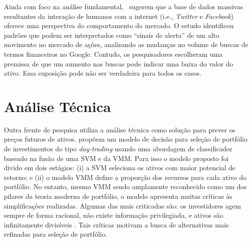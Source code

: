 Ainda com foco na análise fundamental,~\textcite{google_trends} sugerem que a base de dados massivas resultantes da interação de humanos com a internet (i.e., \textit{Twitter} e \textit{Facebook}) oferece uma perspectiva do comportamento do mercado. O estudo identificou padrões que podem ser interpretados como ``sinais de alerta'' de um alto movimento no mercado de ações, analisando as mudanças no volume de buscas de termos financeiros no Google. Contudo, os pesquisadores escolheram uma premissa de que um aumento nas buscas pode indicar uma baixa do valor do ativo. Essa suposição pode não ser verdadeira para todos os casos.


\section{Análise Técnica}

Outra frente de pesquisa utiliza a análise técnica como solução para prever os preços futuros de ativos. \textcite{fusionportifolio} propõem um modelo de decisão para seleção de portfólio de investimentos do tipo \emph{day-trading} usando uma abordagem de classificador baseado na fusão de uma \acrshort{SVM} e da \acrshort{VMM}. Para isso o modelo proposto foi divido em dois estágios: (i) a \acrshort{SVM} seleciona os ativos com maior potencial de retorno; e (ii) o modelo \acrshort{VMM} define a proporção dos recursos para cada ativo do portfólio. No entanto, mesmo \acrshort{VMM} sendo amplamente reconhecido como um dos pilares da teoria moderna de portfólio, o modelo apresenta muitas críticas às simplificações realizadas. Algumas das mais criticadas são: os investidores agem sempre de forma racional, não existe informação privilegiada, e ativos são infinitamente divisíveis \cite{cesarone2011portfolio}. Tais críticas motivam a busca de alternativas mais refinadas para seleção de portfólio. 

